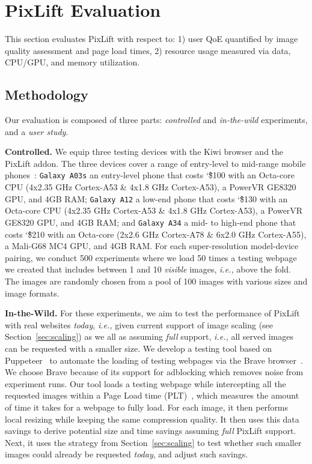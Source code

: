 \documentclass[acmsmall]{acmart}
\newcommand{\tool}{{PixLift}\xspace}
\newcommand{\ie}{{\it i.e.,}\xspace}
\begin{document}
\section{\tool Evaluation}
\label{sec:perf}
This section evaluates \tool with respect to: 1) user QoE quantified by image quality assessment and page load times, 2) resource usage measured via data, CPU/GPU, and memory utilization. 

\subsection{Methodology}
Our evaluation is composed of three parts: \textit{controlled} and \textit{in-the-wild} experiments, and a \textit{user study}. 

\vspace{0.05in}
\noindent
\textbf{Controlled.} We equip three testing devices with the Kiwi browser and the \tool addon. The three devices cover a range of entry-level to mid-range mobile phones~\cite{A03s,A12,A34}: \texttt{Galaxy A03s} an entry-level phone that costs \char`\~ \$100 with an Octa-core CPU (4x2.35 GHz Cortex-A53 \& 4x1.8 GHz Cortex-A53), a PowerVR GE8320 GPU, and 4GB RAM; \texttt{Galaxy A12} a low-end phone that costs \char`\~ \$130 with an Octa-core CPU (4x2.35 GHz Cortex-A53 \& 4x1.8 GHz Cortex-A53), a PowerVR GE8320 GPU, and 4GB RAM; and \texttt{Galaxy A34} a mid- to high-end phone that costs \char`\~ \$210 with an Octa-core (2x2.6 GHz Cortex-A78 \& 6x2.0 GHz Cortex-A55), a Mali-G68 MC4 GPU, and 4GB RAM. For each super-resolution model-device pairing, we conduct 500 experiments where we load 50 times a testing webpage we created that includes between 1 and 10 \textit{visible} images, \ie above the fold. The images are randomly chosen from a pool of 100 images with various sizes and image formats. 

\vspace{0.05in}
\noindent
\textbf{In-the-Wild.} For these experiments, we aim to test the performance of \tool with real websites \textit{today}, \ie given current support of image scaling (see Section~\ref{sec:scaling}) as we all as assuming \textit{full} support, \ie all served images can be requested with a smaller size. We develop a testing tool based on Puppeteer~\cite{puppeteer} to automate the loading of testing webpages via the Brave browser~\cite{brave}. We choose Brave because of its support for adblocking which removes noise from experiment runs. Our tool loads a testing webpage while intercepting all the requested images within a Page Load time (PLT)~\cite{MDN2024PageLoadTime}, which measures  the amount of time it takes for a webpage to fully load. For each image, it then performs local resizing while keeping the same compression quality. It then uses this data savings to derive potential size and time savings assuming \textit{full} \tool support. Next, it uses the strategy from Section~\ref{sec:scaling} to test whether such smaller images could already be requested \textit{today}, and adjust such savings. 
\end{document}
